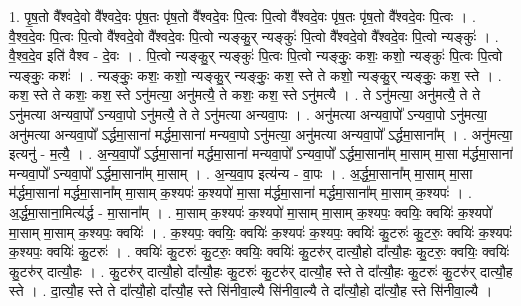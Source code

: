 \documentclass[17pt]{extarticle}
\begin{document}
1. पृ॒ष॒तो वै᳚श्वदे॒वो वै᳚श्वदे॒वः पृ॑ष॒तः पृ॑ष॒तो वै᳚श्वदे॒वः पि॒त्वः पि॒त्वो वै᳚श्वदे॒वः पृ॑ष॒तः पृ॑ष॒तो वै᳚श्वदे॒वः पि॒त्वः । . वै॒श्व॒दे॒वः पि॒त्वः पि॒त्वो वै᳚श्वदे॒वो वै᳚श्वदे॒वः पि॒त्वो न्यङ्कु॒र् न्यङ्कुः॑ पि॒त्वो वै᳚श्वदे॒वो वै᳚श्वदे॒वः पि॒त्वो न्यङ्कुः॑ । . वै॒श्व॒दे॒व इति॑ वैश्व - दे॒वः । . पि॒त्वो न्यङ्कु॒र् न्यङ्कुः॑ पि॒त्वः पि॒त्वो न्यङ्कुः॒ कशः॒ कशो॒ न्यङ्कुः॑ पि॒त्वः पि॒त्वो न्यङ्कुः॒ कशः॑ । . न्यङ्कुः॒ कशः॒ कशो॒ न्यङ्कु॒र् न्यङ्कुः॒ कश॒ स्ते ते कशो॒ न्यङ्कु॒र् न्यङ्कुः॒ कश॒ स्ते । . कश॒ स्ते ते कशः॒ कश॒ स्ते ऽनु॑मत्या॒ अनु॑मत्यै॒ ते कशः॒ कश॒ स्ते ऽनु॑मत्यै । . ते ऽनु॑मत्या॒ अनु॑मत्यै॒ ते ते ऽनु॑मत्या अन्यवा॒पो᳚ ऽन्यवा॒पो ऽनु॑मत्यै॒ ते ते ऽनु॑मत्या अन्यवा॒पः । . अनु॑मत्या अन्यवा॒पो᳚ ऽन्यवा॒पो ऽनु॑मत्या॒ अनु॑मत्या अन्यवा॒पो᳚ ऽर्द्धमा॒साना॑ मर्द्धमा॒साना॑ मन्यवा॒पो ऽनु॑मत्या॒ अनु॑मत्या अन्यवा॒पो᳚ ऽर्द्धमा॒साना᳚म् । . अनु॑मत्या॒ इत्यनु॑ - म॒त्यै॒ । . अ॒न्य॒वा॒पो᳚ ऽर्द्धमा॒साना॑ मर्द्धमा॒साना॑ मन्यवा॒पो᳚ ऽन्यवा॒पो᳚ ऽर्द्धमा॒साना᳚म् मा॒साम् मा॒सा म॑र्द्धमा॒साना॑ मन्यवा॒पो᳚ ऽन्यवा॒पो᳚ ऽर्द्धमा॒साना᳚म् मा॒साम् । . अ॒न्य॒वा॒प इत्य॑न्य - वा॒पः । . अ॒र्द्ध॒मा॒साना᳚म् मा॒साम् मा॒सा म॑र्द्धमा॒साना॑ मर्द्धमा॒साना᳚म् मा॒साम् क॒श्यपः॑ क॒श्यपो॑ मा॒सा म॑र्द्धमा॒साना॑ मर्द्धमा॒साना᳚म् मा॒साम् क॒श्यपः॑ । . अ॒र्द्ध॒मा॒साना॒मित्य॑र्द्ध - मा॒साना᳚म् । . मा॒साम् क॒श्यपः॑ क॒श्यपो॑ मा॒साम् मा॒साम् क॒श्यपः॒ क्वयिः॒ क्वयिः॑ क॒श्यपो॑ मा॒साम् मा॒साम् क॒श्यपः॒ क्वयिः॑ । . क॒श्यपः॒ क्वयिः॒ क्वयिः॑ क॒श्यपः॑ क॒श्यपः॒ क्वयिः॑ कु॒टरुः॑ कु॒टरुः॒ क्वयिः॑ क॒श्यपः॑ क॒श्यपः॒ क्वयिः॑ कु॒टरुः॑ । . क्वयिः॑ कु॒टरुः॑ कु॒टरुः॒ क्वयिः॒ क्वयिः॑ कु॒टरु॑र् दात्यौ॒हो दा᳚त्यौ॒हः कु॒टरुः॒ क्वयिः॒ क्वयिः॑ कु॒टरु॑र् दात्यौ॒हः । . कु॒टरु॑र् दात्यौ॒हो दा᳚त्यौ॒हः कु॒टरुः॑ कु॒टरु॑र् दात्यौ॒ह स्ते ते दा᳚त्यौ॒हः कु॒टरुः॑ कु॒टरु॑र् दात्यौ॒ह स्ते । . दा॒त्यौ॒ह स्ते ते दा᳚त्यौ॒हो दा᳚त्यौ॒ह स्ते सि॑नीवा॒ल्यै सि॑नीवा॒ल्यै ते दा᳚त्यौ॒हो दा᳚त्यौ॒ह स्ते सि॑नीवा॒ल्यै । \newline
\end{document}
